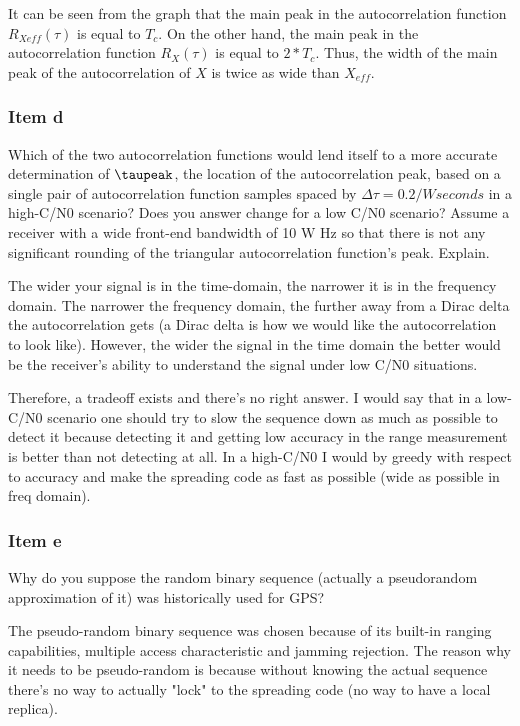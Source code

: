 It can be seen from the graph that the main peak in the autocorrelation function
$R_{Xeff} (\tau )$ is equal to $T_c$. On the other hand, the main peak in the
autocorrelation function $R_{X} (\tau )$ is equal to $2*T_c$. Thus, the
width of the main peak of the autocorrelation of $X$ is twice as wide than
$X_{eff}$.

\subsubsection{Item d}

Which of the two autocorrelation functions would lend itself to a more accurate
determination of $\taupeak$, the location of the autocorrelation peak, based on
a single pair of autocorrelation function samples spaced by
$\Delta \tau = 0.2/W seconds$ in a high-C/N0 scenario? Does you answer change for
a low C/N0 scenario? Assume a receiver with a wide front-end bandwidth of 10 W Hz
so that there is not any significant rounding of the triangular autocorrelation
function’s peak. Explain.


The wider your signal is in the time-domain, the narrower it is in the
frequency domain. The narrower the frequency domain, the further away from a
Dirac delta the autocorrelation gets (a Dirac delta is how we would like the
autocorrelation to look like).
However, the wider the signal in the time domain the better would be the
receiver's ability to understand the signal under low C/N0 situations.

Therefore, a tradeoff exists and there's no right answer. I would say
that in a low-C/N0 scenario one should try to slow the sequence down as
much as possible to detect it because detecting it and getting low
accuracy in the range measurement is better than not detecting at all. In
a high-C/N0 I would by greedy with respect to accuracy and make the
spreading code as fast as possible (wide as possible in freq domain).

\subsubsection{Item e}

Why do you suppose the random binary sequence (actually a pseudorandom
approximation of it) was historically used for GPS?

The pseudo-random binary sequence was chosen because of its built-in
ranging capabilities, multiple access characteristic and jamming
rejection. The reason why it needs to be pseudo-random is because without
knowing the actual sequence there's no way to actually "lock" to the
spreading code (no way to have a local replica).

